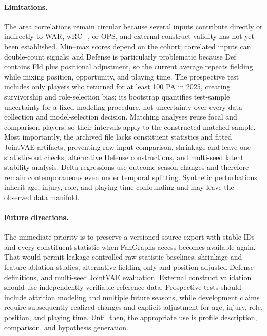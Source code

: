 \documentclass[10pt,twocolumn,letterpaper]{article}
\begin{document}
\paragraph{Limitations.}
The area correlations remain circular because several inputs contribute directly or indirectly to WAR, wRC+, or OPS, and external construct validity has not yet been established. Min--max scores depend on the cohort; correlated inputs can double-count signals; and Defense is particularly problematic because Def contains Fld plus positional adjustment, so the current average repeats fielding while mixing position, opportunity, and playing time. The prospective test includes only players who returned for at least 100 PA in 2025, creating survivorship and role-selection bias; its bootstrap quantifies test-sample uncertainty for a fixed modeling procedure, not uncertainty over every data-collection and model-selection decision. Matching analyses reuse focal and comparison players, so their intervals apply to the constructed matched sample. Most importantly, the archived file lacks constituent statistics and fitted JointVAE artifacts, preventing raw-input comparison, shrinkage and leave-one-statistic-out checks, alternative Defense constructions, and multi-seed latent stability analysis. Delta regressions use outcome-season changes and therefore remain contemporaneous even under temporal splitting. Synthetic perturbations inherit age, injury, role, and playing-time confounding and may leave the observed data manifold.

\paragraph{Future directions.}
The immediate priority is to preserve a versioned source export with stable IDs and every constituent statistic when FanGraphs access becomes available again. That would permit leakage-controlled raw-statistic baselines, shrinkage and feature-ablation studies, alternative fielding-only and position-adjusted Defense definitions, and multi-seed JointVAE evaluation. External construct validation should use independently verifiable reference data. Prospective tests should include attrition modeling and multiple future seasons, while development claims require subsequently realized changes and explicit adjustment for age, injury, role, position, and playing time. Until then, the appropriate use is profile description, comparison, and hypothesis generation.
\end{document}

